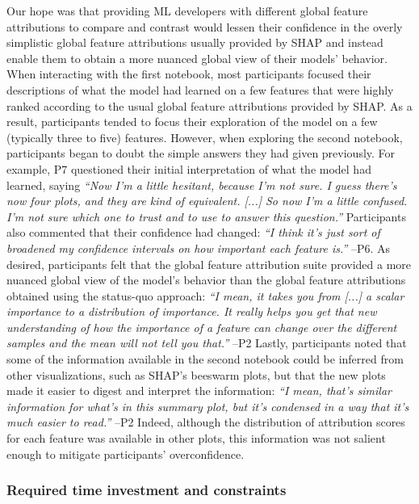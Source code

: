 \documentclass[11pt,dvipdfmx]{article}
\begin{document}
Our hope was that providing ML developers with different global
feature attributions to compare and contrast would lessen their
confidence in the overly simplistic global feature attributions
usually provided by SHAP and instead enable them to obtain a more
nuanced global view of their models' behavior. When interacting with
the first notebook, most participants focused their descriptions of
what the model had learned on a few features that were highly ranked
according to the usual global feature attributions provided by
SHAP. As a result, participants tended to focus their exploration of
the model on a few (typically three to five) features. However, when
exploring the second notebook, participants began to doubt the simple
answers they had given previously.  For example, P7 questioned their
initial interpretation of what the model had learned, saying
\textit{``Now I'm a little hesitant, because I'm not sure. I guess
  there's now four plots, and they are kind of equivalent. [...] So
  now I'm a little confused. I'm not sure which one to trust and to
  use to answer this question.''}  Participants also commented that
their confidence had changed: \textit{``I think it's just sort of
  broadened my confidence intervals on how important each feature
  is.''} \hbox{--P6}.  As desired, participants felt that the global
feature attribution suite provided a more nuanced global view of the
model's behavior than the global feature attributions obtained using
the status-quo approach: \textit{``I mean, it takes you from [...] a
  scalar importance to a distribution of importance. It really helps
  you get that new understanding of how the importance of a feature
  can change over the different samples and the mean will not tell you
  that.''}  --P2 Lastly, participants noted that some of the
information available in the second notebook could be inferred from
other visualizations, such as SHAP's beeswarm plots, but that the new
plots made it easier to digest and interpret the information:
\textit{``I mean, that's similar information for what's in this
  summary plot, but it's condensed in a way that it's much easier to
  read.''} --P2 Indeed, although the distribution of attribution
scores for each feature was available in other plots, this information
was not salient enough to mitigate participants'
overconfidence.

\subsubsection{Required time investment and constraints} \label{sec:time_investment}
\end{document}
